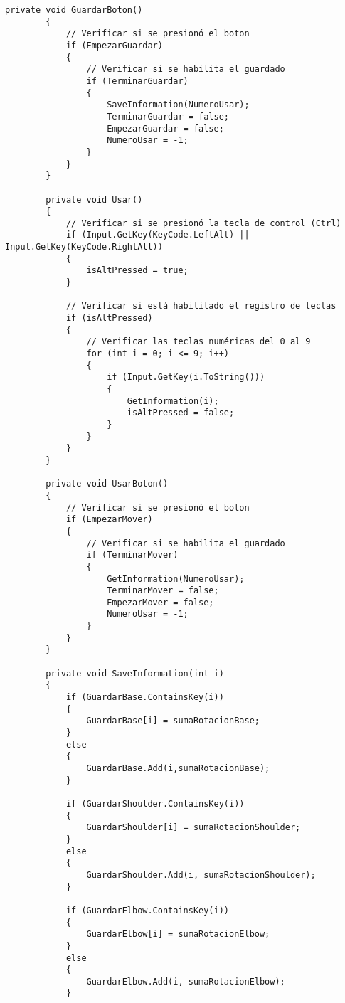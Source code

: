 \begin{lstlisting}[frame=single]
        private void GuardarBoton()
        {
            // Verificar si se presionó el boton
            if (EmpezarGuardar)
            {
                // Verificar si se habilita el guardado
                if (TerminarGuardar)
                {
                    SaveInformation(NumeroUsar);
                    TerminarGuardar = false;
                    EmpezarGuardar = false;
                    NumeroUsar = -1;
                }
            }     
        }
    
        private void Usar()
        {
            // Verificar si se presionó la tecla de control (Ctrl)
            if (Input.GetKey(KeyCode.LeftAlt) || Input.GetKey(KeyCode.RightAlt))
            {
                isAltPressed = true;
            }
    
            // Verificar si está habilitado el registro de teclas
            if (isAltPressed)
            {
                // Verificar las teclas numéricas del 0 al 9
                for (int i = 0; i <= 9; i++)
                {
                    if (Input.GetKey(i.ToString()))
                    {
                        GetInformation(i);
                        isAltPressed = false;
                    }
                }
            }
        }
    
        private void UsarBoton()
        {
            // Verificar si se presionó el boton
            if (EmpezarMover)
            {
                // Verificar si se habilita el guardado
                if (TerminarMover)
                {
                    GetInformation(NumeroUsar);
                    TerminarMover = false;
                    EmpezarMover = false;
                    NumeroUsar = -1;
                }
            }
        }
    
        private void SaveInformation(int i)
        {
            if (GuardarBase.ContainsKey(i))
            {
                GuardarBase[i] = sumaRotacionBase;
            }
            else
            {
                GuardarBase.Add(i,sumaRotacionBase);
            }
    
            if (GuardarShoulder.ContainsKey(i))
            {
                GuardarShoulder[i] = sumaRotacionShoulder;
            }
            else
            {
                GuardarShoulder.Add(i, sumaRotacionShoulder);
            }
    
            if (GuardarElbow.ContainsKey(i))
            {
                GuardarElbow[i] = sumaRotacionElbow;
            }
            else
            {
                GuardarElbow.Add(i, sumaRotacionElbow);
            }
    

\end{lstlisting}

